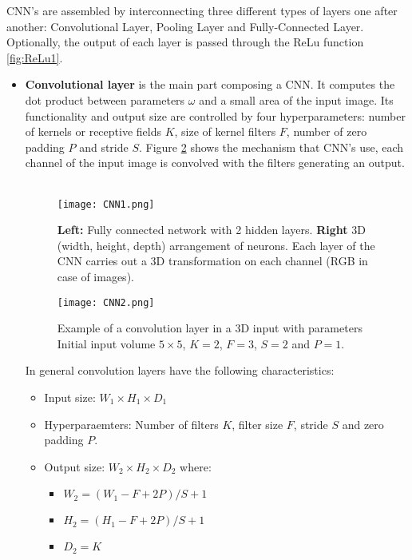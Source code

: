 CNN's are assembled by interconnecting three different types of layers one after another: Convolutional Layer, Pooling Layer and Fully-Connected Layer. Optionally, the output of each layer is passed through the ReLu function \ref{fig:ReLu1}. 
\begin{itemize}
\item \textbf{Convolutional layer} is the main part composing a CNN. It computes the dot product between parameters $\omega$ and a small area of the input image. Its  functionality and output size are controlled by four hyperparameters: number of kernels or receptive fields $K$, size of kernel filters $F$, number of zero padding $P$ and stride $S$. Figure \ref{fig:CNNim2} shows the mechanism that  CNN's use, each channel of the input image is convolved with the filters generating an output.  \

\begin{figure}[tb] 
\centering 
\texttt{[image: CNN1.png]} 
\caption[Fully connected network VS CNN]{\textbf{Left:} Fully connected network with 2 hidden layers. \textbf{Right} 3D (width, height, depth) arrangement of neurons. Each layer of the CNN carries out a 3D transformation on each channel (RGB in case of images). }
\label{fig:CNNim1} 
\end{figure}
\begin{figure}[tb] 
\centering 
\texttt{[image: CNN2.png]} 
\caption[Convolution layer]{Example of a convolution layer in a 3D input with parameters Initial input volume $5 \times 5$, $K=2$, $F=3$, $S=2$ and $P=1$.}
\label{fig:CNNim2} 
\end{figure}


In general convolution layers have the following characteristics:
\begin{itemize}
\item Input size: \boldmath$W_1 \times H_1 \times D_1$
\item Hyperparaemters: Number of filters \boldmath$K$, filter size \boldmath$F$, stride \boldmath$S$ and zero padding \boldmath$P$.  
\item Output size: \boldmath$W_2 \times H_2 \times D_2$ where:
\begin{itemize} \label{sec:outCNN}
\item \boldmath$W_2 = ( W_1 - F + 2P) / S + 1 $
\item \boldmath$H_2 = ( H_1 - F + 2P) / S + 1 $
\item \boldmath$D_2 = K $
\end{itemize}
\end{itemize}


\end{itemize}
